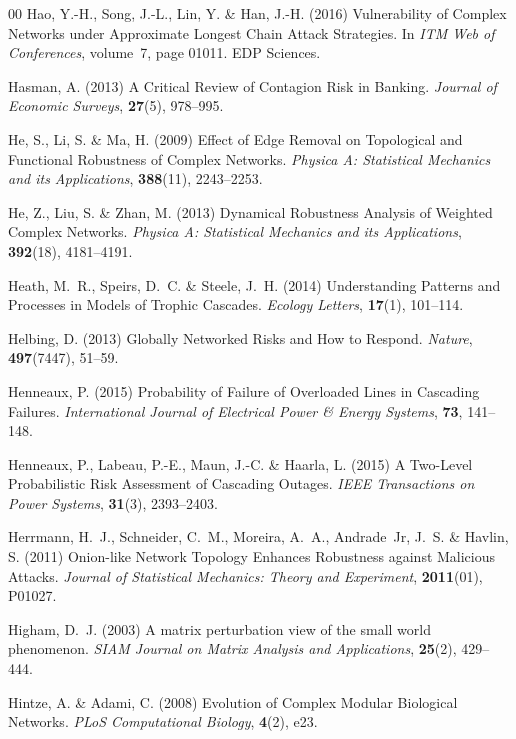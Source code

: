 \documentclass{comnet-mod}
\begin{document}
\begin{thebibliography}{00}
Hao, Y.-H., Song, J.-L., Lin, Y. {\&} Han, J.-H. (2016)  {Vulnerability of
  Complex Networks under Approximate Longest Chain Attack Strategies}. In {\em
  {{{ITM}} Web of Conferences}}, volume~7, page 01011. {EDP Sciences}.

Hasman, A. (2013)  {A Critical Review of Contagion Risk in Banking}. {\em
  {Journal of Economic Surveys}}, \textbf{27}(5), 978--995.

He, S., Li, S. {\&} Ma, H. (2009)  {Effect of Edge Removal on Topological and
  Functional Robustness of Complex Networks}. {\em {Physica A: Statistical
  Mechanics and its Applications}}, \textbf{388}(11), 2243--2253.

He, Z., Liu, S. {\&} Zhan, M. (2013)  {Dynamical Robustness Analysis of
  Weighted Complex Networks}. {\em {Physica A: Statistical Mechanics and its
  Applications}}, \textbf{392}(18), 4181--4191.

Heath, M.~R., Speirs, D.~C. {\&} Steele, J.~H. (2014)  {Understanding Patterns
  and Processes in Models of Trophic Cascades}. {\em {Ecology Letters}},
  \textbf{17}(1), 101--114.

Helbing, D. (2013)  {Globally Networked Risks and How to Respond}. {\em
  {Nature}}, \textbf{497}(7447), 51--59.

Henneaux, P. (2015)  {Probability of Failure of Overloaded Lines in Cascading
  Failures}. {\em {International Journal of Electrical Power \& Energy
  Systems}}, \textbf{73}, 141--148.

Henneaux, P., Labeau, P.-E., Maun, J.-C. {\&} Haarla, L. (2015)  {A Two-Level
  Probabilistic Risk Assessment of Cascading Outages}. {\em {IEEE Transactions
  on Power Systems}}, \textbf{31}(3), 2393--2403.

Herrmann, H.~J., Schneider, C.~M., Moreira, A.~A., Andrade~Jr, J.~S. {\&}
  Havlin, S. (2011)  {Onion-like Network Topology Enhances Robustness against
  Malicious Attacks}. {\em {Journal of Statistical Mechanics: Theory and
  Experiment}}, \textbf{2011}(01), P01027.

Higham, D.~J. (2003)  A matrix perturbation view of the small world phenomenon.
  {\em {SIAM Journal on Matrix Analysis and Applications}}, \textbf{25}(2),
  429--444.

Hintze, A. {\&} Adami, C. (2008)  {Evolution of Complex Modular Biological
  Networks}. {\em {PLoS Computational Biology}}, \textbf{4}(2), e23.


\end{thebibliography}
\end{document}
